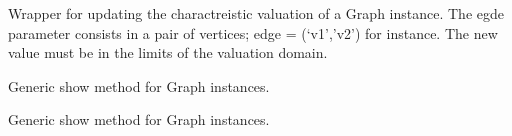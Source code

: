 \documentclass[letterpaper,10pt,english]{sphinxmanual}
\begin{document}
\begin{fulllineitems}
\begin{fulllineitems}
\end{fulllineitems}


\begin{fulllineitems}
\label{techDoc:graphs.Graph.setEdgeValue}
Wrapper for updating the charactreistic valuation of a Graph instance.
The egde parameter consists in a pair of vertices;
edge = (`v1','v2') for instance.
The new value must be in the limits of the valuation domain.

\end{fulllineitems}


\begin{fulllineitems}
\label{techDoc:graphs.Graph.showCliques}
\end{fulllineitems}


\begin{fulllineitems}
\label{techDoc:graphs.Graph.showMIS}
\end{fulllineitems}


\begin{fulllineitems}
\label{techDoc:graphs.Graph.showMore}
Generic show method for Graph instances.

\end{fulllineitems}


\begin{fulllineitems}
\label{techDoc:graphs.Graph.showShort}
Generic show method for Graph instances.

\end{fulllineitems}


\end{fulllineitems}

\end{document}
